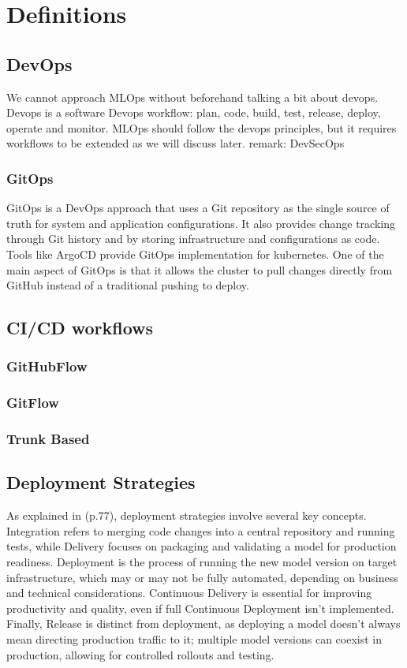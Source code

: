 \section{Definitions}\label{sec:stdefinitions}
\subsection{DevOps}
We cannot approach MLOps without beforehand talking a bit about devops.
Devops is a software
Devops workflow: plan, code, build, test, release, deploy, operate and monitor.
MLOps should follow the devops principles, but it requires workflows to be extended as we will discuss later.
remark: DevSecOps

\subsubsection{GitOps}
GitOps is a DevOps approach that uses a Git repository as the single source of truth for system and application configurations.
It also provides change tracking through Git history and by storing infrastructure and configurations as code.
Tools like ArgoCD provide GitOps implementation for kubernetes\cite{gitops}.
One of the main aspect of GitOps is that it allows the cluster to pull changes directly from GitHub instead of a
traditional pushing to deploy.


\subsection{CI/CD workflows}
\subsubsection{GitHubFlow}
\subsubsection{GitFlow}
\subsubsection{Trunk Based}
\subsection{Deployment Strategies}

As explained in \cite{treveil2020introducing}(p.77), deployment strategies involve several key concepts.
Integration refers to merging code changes into a central repository and running tests,
while Delivery focuses on packaging and validating a model for production readiness.
Deployment is the process of running the new model version on target infrastructure,
which may or may not be fully automated, depending on business and technical considerations.
Continuous Delivery is essential for improving productivity and quality, even if full Continuous Deployment isn't implemented.
Finally, Release is distinct from deployment, as deploying a model doesn't always mean directing production traffic to it;
multiple model versions can coexist in production, allowing for controlled rollouts and testing.

